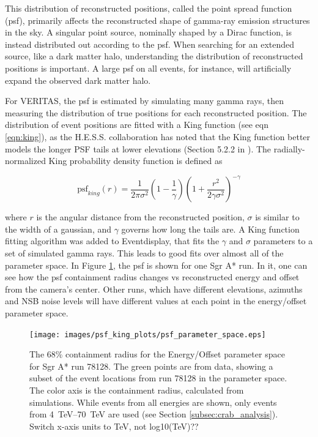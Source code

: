     This distribution of reconstructed positions, called the point spread function (psf), primarily affects the reconstructed shape of gamma-ray emission structures in the sky.
    A singular point source, nominally shaped by a Dirac function, is instead distributed out according to the psf.
    When searching for an extended source, like a dark matter halo, understanding the distribution of reconstructed positions is important.
    A large psf on all events, for instance, will artificially expand the observed dark matter halo.

    For VERITAS, the psf is estimated by simulating many gamma rays, then measuring the distribution of true positions for each reconstructed position.
    The distribution of event positions are fitted with a King function \cite{king1962} (see eqn \ref{eqn:king}), as the H.E.S.S. collaboration has noted that the King function better models the longer PSF tails at lower elevations (Section 5.2.2 in \cite{Mayer2015}).
    The radially-normalized King probability density function is defined as

    \begin{equation} \label{eqn:king}
    \text{psf}_{king}(r) = \frac{1}{2 \pi \sigma^{2} } \left( 1 - \frac{1}{\gamma} \right) \left( 1 + \frac{ r^{2} }{ 2 \gamma \sigma^{2} } \right)^{-\gamma}
    \end{equation}

    where $r$ is the angular distance from the reconstructed position, $\sigma$ is similar to the width of a gaussian, and $\gamma$ governs how long the tails are.
    A King function fitting algorithm was added to Eventdisplay, that fits the $\gamma$ and $\sigma$ parameters to a set of simulated gamma rays.
    This leads to good fits over almost all of the parameter space.
    In Figure \ref{fig:psf_paramspace}, the psf is shown for one Sgr A* run.
    In it, one can see how the psf containment radius changes vs reconstructed energy and offset from the camera's center.
    Other runs, which have different elevations, azimuths and NSB noise levels will have different values at each point in the energy/offset parameter space.

    \begin{figure}[ht]
      \centering
      \texttt{[image: images/psf\_king\_plots/psf\_parameter\_space.eps]}
      \caption[PSF Parameter Space]{
        The 68\% containment radius for the Energy/Offset parameter space for Sgr A* run 78128. 
        The green points are from data, showing a subset of the event locations from run 78128 in the parameter space.
        The color axis is the containment radius, calculated from simulations.
        While events from all energies are shown, only events from \SIrange{4}{70}{\TeV} are used (see Section \ref{subsec:crab_analysis}).
        {\color{red}Switch x-axis units to TeV, not log10(TeV)??}
      }
      \label{fig:psf_paramspace}
    \end{figure}

